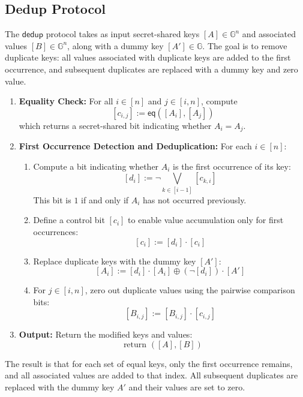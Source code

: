 \subsection{Dedup Protocol} \label{sec:dedup}
The $\mathsf{dedup}$ protocol takes as input secret-shared keys $[A] \in \mathbb{G}^n$ and associated values $[B] \in \mathbb{G}^n$, along with a dummy key $[A'] \in \mathbb{G}$. The goal is to remove duplicate keys: all values associated with duplicate keys are added to the first occurrence, and subsequent duplicates are replaced with a dummy key and zero value.

\begin{enumerate}
    \item \textbf{Equality Check:} For all $i \in [n]$ and $j \in [i, n]$, compute
    \[
    [c_{i,j}] := \mathsf{eq}([A_i], [A_j])
    \]
    which returns a secret-shared bit indicating whether $A_i = A_j$.

    \item \textbf{First Occurrence Detection and Deduplication:} For each $i \in [n]$:
    \begin{enumerate}
        \item Compute a bit indicating whether $A_i$ is the first occurrence of its key:
        \[
        [d_i] := \neg \bigvee_{k \in [i-1]} [c_{k,i}]
        \]
        This bit is $1$ if and only if $A_i$ has not occurred previously.

        \item Define a control bit $[c_i]$ to enable value accumulation only for first occurrences:
        \[
        [c_i] := [d_i] \cdot [c_i]
        \]

        \item Replace duplicate keys with the dummy key $[A']$:
        \[
        [A_i] := [d_i] \cdot [A_i] \oplus (\neg [d_i]) \cdot [A']
        \]

        \item For $j \in [i, n]$, zero out duplicate values using the pairwise comparison bits:
        \[
        [B_{i,j}] := [B_{i,j}] \cdot [c_{i,j}]
        \]
    \end{enumerate}

    \item \textbf{Output:} Return the modified keys and values:
    \[
    \text{return } ([A], [B])
    \]
\end{enumerate}

The result is that for each set of equal keys, only the first occurrence remains, and all associated values are added to that index. All subsequent duplicates are replaced with the dummy key $A'$ and their values are set to zero.
